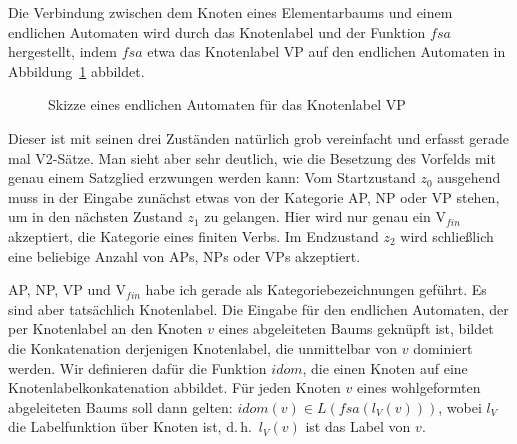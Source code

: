 Die Verbindung zwischen dem Knoten eines Elementarbaums und einem endlichen Automaten wird durch das Knotenlabel und der Funktion $f\!sa$ hergestellt, indem $f\!sa$ etwa das Knotenlabel VP auf den endlichen Automaten in Abbildung~\ref{fig-fsa} abbildet.
\begin{figure}[t]
\centering
{}
\caption{\label{fig-fsa}Skizze eines endlichen Automaten für das Knotenlabel VP}
\end{figure} 
Dieser ist mit seinen drei Zuständen natürlich grob vereinfacht und erfasst gerade mal V2-Sätze. Man sieht aber sehr deutlich, wie die Besetzung des Vorfelds mit genau einem Satzglied erzwungen werden kann: Vom Startzustand $z_0$ ausgehend muss in der Eingabe zunächst etwas von der Kategorie AP, NP oder VP stehen, um in den nächsten Zustand $z_1$ zu gelangen. Hier wird nur genau ein V$_{fin}$ akzeptiert, die Kategorie eines finiten Verbs. Im Endzustand $z_2$ wird schlie\ss lich eine beliebige Anzahl von  APs, NPs oder VPs akzeptiert.   

AP, NP, VP und V$_{fin}$ habe ich gerade als Kategoriebezeichnungen geführt. Es sind aber tatsächlich Knotenlabel. Die Eingabe für den endlichen Automaten, der per Knotenlabel an den Knoten $v$ eines abgeleiteten Baums geknüpft ist, bildet die Konkatenation derjenigen Knotenlabel, die unmittelbar von $v$ dominiert werden. Wir definieren dafür die Funktion $idom$, die einen Knoten auf eine Knotenlabelkonkatenation abbildet. Für jeden Knoten $v$ eines wohlgeformten abgeleiteten Baums soll dann gelten: $idom (v) \in L(f\!sa(l_V(v)))$, wobei $l_V$ die Labelfunktion über Knoten ist, d.\,h.\ $l_V (v)$ ist das Label von $v$.   
 
